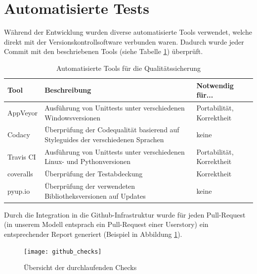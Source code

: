 \section{Automatisierte Tests}
Während der Entwicklung wurden diverse automatisierte Tools verwendet, welche direkt mit der Versionskontrollsoftware
verbunden waren. Dadurch wurde jeder Commit mit den beschriebenen Tools (siehe Tabelle \ref{qs_tools}) überprüft.
\begin{table}[H]
	\centering
	\begin{tabular}{|l|p{18em}|l|}
		\hline
		\textbf{Tool} & \textbf{Beschreibung} & \textbf{Notwendig für...} \\\hline
		AppVeyor & Ausführung von Unittests unter verschiedenen Windowsversionen & Portabilität, Korrektheit \\\hline
		Codacy & Überprüfung der Codequalität basierend auf Styleguides der verschiedenen Sprachen& keine \\\hline
		Travis CI & Ausführung von Unittests unter verschiedenen Linux- und Pythonversionen & Portabilität, Korrektheit \\\hline
		coveralls & Überprüfung der Testabdeckung & Korrektheit \\\hline
		pyup.io & Überprüfung der verwendeten Bibliotheksversionen auf Updates & keine \\\hline
	\end{tabular}
	\caption{Automatisierte Tools für die Qualitätssicherung}
	\label{qs_tools}
\end{table}

Durch die Integration in die Github-Infrastruktur wurde für jeden Pull-Request (in unserem Modell entsprach ein Pull-Request einer Userstory)
ein entsprechender Report generiert (Beispiel in Abbildung \ref{github_checks}).

\begin{figure}[h]
	\centering
	\texttt{[image: github\_checks]}
	\caption{Übersicht der durchlaufenden Checks}
	\label{github_checks}
\end{figure}


